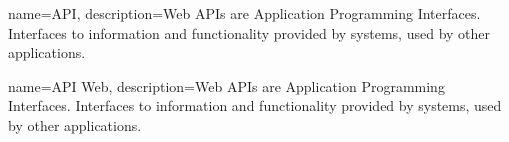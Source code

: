 \label{terminologia}

{
	name=API,
	description={Web APIs are Application Programming Interfaces. Interfaces to information and functionality provided by systems, used by other applications.}
}

{
	name=API Web,
	description={Web APIs are Application Programming Interfaces. Interfaces to information and functionality provided by systems, used by other applications.}
}